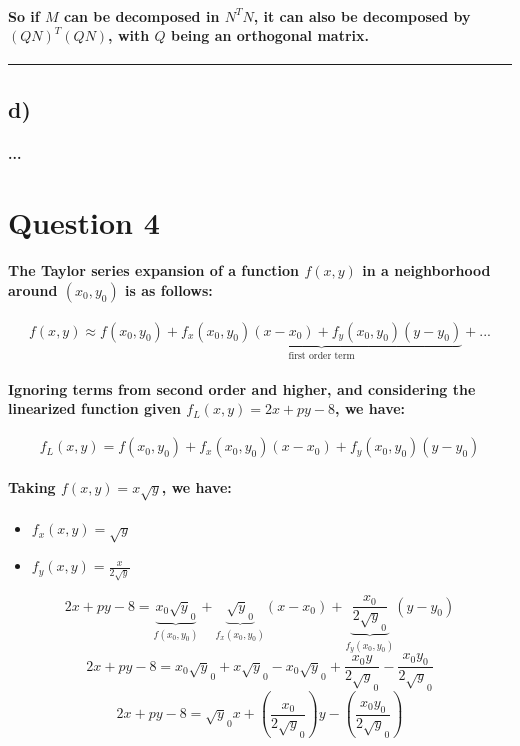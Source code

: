 \documentclass[a4paper]{article}    %
\begin{document}
\paragraph{So if $M$ can be decomposed in $N^TN$, it can also be decomposed by $(QN)^T(QN)$, with $Q$ being an orthogonal matrix.}

\hrule

\subsection*{d)}

\paragraph{...}

\newpage

\section*{Question 4}

\paragraph{The Taylor series expansion of a function $f(x,y)$ in a neighborhood around $(x_0,y_0)$ is as follows:}
    \[f(x,y) \approx f(x_0,y_0) + \underbrace{f_x(x_0,y_0)(x-x_0)+f_y(x_0,y_0)(y-y_0)}_{\text{first order term}} + ...\]

\paragraph{Ignoring terms from second order and higher, and considering the linearized function given $f_L(x,y)=2x+py-8$, we have:}
    \[f_L(x,y) = f(x_0,y_0) + f_x(x_0,y_0)(x-x_0)+f_y(x_0,y_0)(y-y_0)\]

\paragraph{Taking $f(x,y) = x\sqrt y$, we have:}
\begin{itemize}
    \item $f_x(x,y) = \sqrt y$
    \item $f_y(x,y) = \frac{x}{2\sqrt y}$
\end{itemize}
    \[2x+py-8 = \underbrace{x_0\sqrt y_0}_{f(x_0,y_0)} + \underbrace{\sqrt y_0}_{f_x(x_0,y_0)}(x-x_0) + \underbrace{\frac{x_0}{2\sqrt y_0}}_{f_y(x_0,y_0)}(y-y_0)\]
    \[2x+py-8 = x_0\sqrt y_0 + x\sqrt y_0 - x_0\sqrt y_0 + \frac{x_0 y}{2\sqrt y_0} - \frac{x_0 y_0}{2\sqrt y_0}\]
    \[2x+py-8 =  \sqrt y_0 x + \left(\frac{x_0}{2\sqrt y_0}\right) y - \left(\frac{x_0 y_0}{2\sqrt y_0}\right)\]
    
\end{document}
